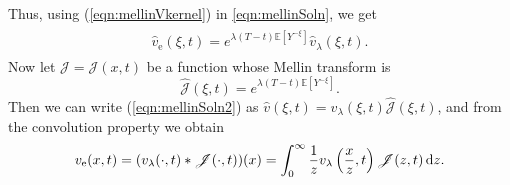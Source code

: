 Thus, using (\ref{eqn:mellinVkernel}) in \eqref{eqn:mellinSoln}, we get
	\begin{align}
		\label{eqn:mellinSoln2}
		\begin{split}
			\hat v_\text{e}(\xi,t) = e^{\lambda(T-t)\mathbb{E}[Y^{-\xi}]}\hat v_\lambda(\xi,t).
		\end{split}
	\end{align}
Now let $\mathscr{J} = \mathscr{J}(x,t)$ be a function whose Mellin transform is
	\begin{equation}
		\label{eqn:JMellin}
		\hat{\mathscr{J}}(\xi,t) =  e^{\lambda(T-t)\mathbb{E}[Y^{-\xi}]}.
	\end{equation}
Then we can write (\ref{eqn:mellinSoln2}) as $\hat{v}(\xi,t) = \hat{v}_\lambda(\xi,t)\hat{\mathscr{J}}(\xi,t)$, and from the convolution property we obtain
	\begin{align}
		\label{eqn:optionJump}
		\begin{split}
			v_{\text{e}}(x,t) = (v_{\lambda}(\cdot,t) \ast \mathscr{J}(\cdot,t))(x) = \int_0^\infty \frac{1}{z}v_{\lambda}\left( \frac{x}{z},t \right)\mathscr{J}(z,t) \, \mathrm d z .
		\end{split}
	\end{align}
